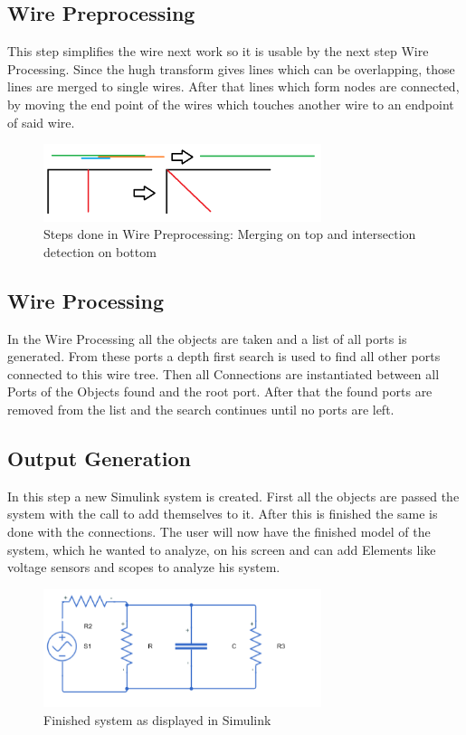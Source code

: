 \documentclass[10pt,twocolumn,letterpaper]{article}
\begin{document}
\subsection{Wire Preprocessing}
This step simplifies the wire next work so it is usable by the next step Wire Processing. Since the hugh transform gives lines which can be overlapping, those lines are merged to
single wires. After that lines which form nodes are connected, by moving the end point of the wires which touches another wire to an endpoint of said wire.
\begin{figure}[!ht]
\includegraphics[width = 3.2in]{img/wirepp.png}
\caption{Steps done in Wire Preprocessing: Merging on top and intersection detection on bottom}
\label{fig:o2}
\end{figure}

\subsection{Wire Processing}
In the Wire Processing all the objects are taken and a list of all ports is generated. From these ports a depth first search is used to find all other ports connected to this wire tree. Then all Connections are instantiated between all Ports of the Objects found and the root port. After that the found ports are removed from the list and the search continues until no ports are left.

\subsection{Output Generation}
In this step a new Simulink system is created. First all the objects are passed the system with the call to add themselves to it. After this is finished the same is done with the connections. The user will now have the finished model of the system, which he wanted to analyze, on his screen and can add Elements like voltage sensors and scopes to analyze his system.
\begin{figure}[!ht]
\includegraphics[width = 3.2in]{img/simscape_system.png}
\caption{Finished system as displayed in Simulink}
\label{fig:o3}
\end{figure}
\end{document}
